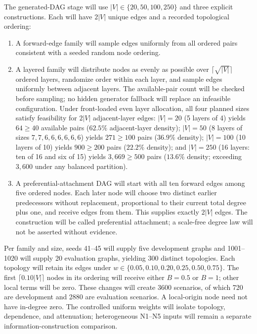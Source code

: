 The generated-DAG stage will use $|V|\in\{20,50,100,250\}$ and three
explicit constructions. Each will have $2|V|$ unique edges and a recorded
topological ordering:
\begin{enumerate}[label=\alph*.,leftmargin=*]
\item A forward-edge family will sample edges uniformly from all ordered
pairs consistent with a seeded random node ordering.
\item A layered family will distribute nodes as evenly as possible over
$\lceil\sqrt{|V|}\rceil$ ordered layers, randomize order within each layer,
and sample edges uniformly between adjacent layers. The available-pair
count will be checked before sampling; no hidden generator fallback will
replace an infeasible configuration. Under front-loaded even layer
allocation, all four planned sizes satisfy feasibility for $2|V|$
adjacent-layer edges: $|V|=20$ (5 layers of 4) yields $64\ge40$ available
pairs ($62.5\%$ adjacent-layer density); $|V|=50$ (8 layers of sizes
$7,7,6,6,6,6,6,6$) yields $271\ge100$ pairs ($36.9\%$ density); $|V|=100$
(10 layers of 10) yields $900\ge200$ pairs ($22.2\%$ density); and
$|V|=250$ (16 layers: ten of 16 and six of 15) yields $3{,}669\ge500$ pairs
($13.6\%$ density; exceeding $3{,}600$ under any balanced partition).
\item A preferential-attachment DAG will start with all ten forward edges
among five ordered nodes. Each later node will choose two distinct earlier
predecessors without replacement, proportional to their current total degree
plus one, and receive edges from them. This supplies exactly $2|V|$ edges.
The construction will be called preferential attachment; a scale-free degree
law will not be asserted without evidence.
\end{enumerate}

Per family and size, seeds 41--45 will supply five development graphs and
1001--1020 will supply 20 evaluation graphs, yielding 300 distinct topologies.
Each topology will retain its edges under
$w\in\{0.05,0.10,0.20,0.25,0.50,0.75\}$. The first
$\lceil0.10|V|\rceil$ nodes in its ordering will receive either $B=0.5$
or $B=1$; other local terms will be zero. These changes will create 3600
scenarios, of which 720 are development and 2880 are evaluation scenarios.
A local-origin node need not have in-degree zero. The controlled uniform
weights will isolate topology, dependence, and attenuation; heterogeneous
N1--N5 inputs will remain a separate information-construction comparison.


